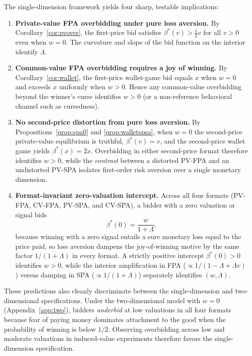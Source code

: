 \documentclass[11pt,a4paper]{article}
\theoremstyle{remark}
\begin{document}
The single-dimension framework yields four sharp, testable implications:
\begin{enumerate}
\item \textbf{Private-value FPA overbidding under pure loss aversion.} By
Corollary~\ref{cor:pvover}, the first-price bid satisfies $\beta^*(v)>\tfrac12 v$ for
all $v>0$ even when $w=0$. The curvature and slope of the bid function on the
interior identify $\Lambda$.
\item \textbf{Common-value FPA overbidding requires a joy of winning.} By
Corollary~\ref{cor:wallet}, the first-price wallet-game bid equals $x$ when $w=0$ and
exceeds $x$ uniformly when $w>0$. Hence any common-value overbidding beyond the
winner's curse identifies $w>0$ (or a non-reference behavioral channel such as
cursedness).
\item \textbf{No second-price distortion from pure loss aversion.} By
Propositions~\ref{prop:spa0} and \ref{prop:walletspsa}, when $w=0$ the second-price
private-value equilibrium is truthful, $\beta^{*}(v)=v$, and the second-price wallet
game yields $\beta^{*}(x)=2x$. Overbidding in either second-price format therefore
identifies $w>0$, while the \emph{contrast} between a distorted PV-FPA and an
undistorted PV-SPA isolates first-order risk aversion over a single monetary
dimension.
\item \textbf{Format-invariant zero-valuation intercept.} Across all four formats
(PV-FPA, CV-FPA, PV-SPA, and CV-SPA), a bidder with a zero valuation or signal bids
\begin{equation}
\beta^{*}(0)=\frac{w}{1+\Lambda},
\end{equation}
because winning with a zero signal entails a sure monetary loss equal to the price
paid, so loss aversion dampens the joy-of-winning motive by the same factor
$1/(1+\Lambda)$ in every format. A strictly positive intercept $\beta^*(0)>0$
identifies $w>0$, while the interior amplification in FPA ($\propto 1/(1-\Lambda+\Lambda v)$)
versus damping in SPA ($\propto 1/(1+\Lambda)$) separately identifies $(w,\Lambda)$.
\end{enumerate}

These predictions also cleanly discriminate between the single-dimension and
two-dimensional specifications. Under the two-dimensional model with $w=0$
(Appendix~\ref{app:two}), bidders \emph{underbid} at low valuations in all four
formats because fear of paying money dominates attachment to the good when the
probability of winning is below $1/2$. Observing overbidding across low and moderate
valuations in induced-value experiments therefore favors the single-dimension
specification.
\end{document}
